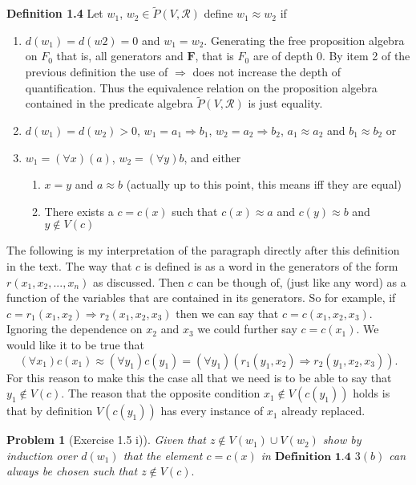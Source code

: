 \documentclass{article}
\theoremstyle{problemstyle}
\newtheorem{problem}{Problem}
\begin{document}
\begin{flushleft}
\textbf{Definition 1.4} Let $w_1$, $w_2 \in \widetilde{P}(V,\mathscr{R})$ define $w_1 \approx w_2$ if

\begin{enumerate}
\item $d(w_1) = d(w2) = 0$ and $w_1 = w_2$. Generating the free proposition algebra on $F_0$ that is, all generators and $\textbf{F}$, that is $F_0$ are of depth 0. By item 2 of the previous definition the use of $\Rightarrow$ does not increase the depth of quantification. Thus the equivalence relation on the proposition algebra contained in the predicate algebra $\widetilde{P}(V,\mathscr{R})$ is just equality. 
\item $d(w_1) = d(w_2) > 0$, $w_1 = a_1 \Rightarrow b_1$, $w_2 = a_2 \Rightarrow b_2$, $a_1 \approx a_2$ and $b_1 \approx b_2$ or 
\item $w_1 = (\forall x)(a)$, $w_2 = (\forall y)b$, and either
\begin{enumerate}
\item $x = y$ and $a \approx b$   (actually up to this point, this means iff they are equal)
\item There exists a $c = c(x)$ such that $c(x) \approx a$ and $c(y) \approx b$ and $y \notin V(c)$ 
\end{enumerate}
\end{enumerate}

The following is my interpretation of the paragraph directly after this definition in the text. The way that $c$ is defined is as a word in the generators of the form $r(x_1,x_2,...,x_n)$ as discussed. Then $c$ can be though of, (just like any word) as a function of the variables that are contained in its generators. So for example, if $c = r_1(x_1,x_2)\Rightarrow r_2(x_1,x_2,x_3)$ then we can say that $c = c(x_1,x_2,x_3)$. Ignoring the dependence on $x_2$ and $x_3$ we could further say $c = c(x_1)$. We would like it to be true that $$(\forall x_1)c(x_1) \approx (\forall y_1)c(y_1) = (\forall y_1)(r_1(y_1,x_2)\Rightarrow r_2(y_1,x_2,x_3)).$$ For this reason to make this the case all that we need is to be able to say that $y_1 \notin V(c)$. The reason that the opposite condition $x_1 \notin V(c(y_1))$ holds is that by definition $V(c(y_1))$ has every instance of $x_1$ already replaced. 
\end{flushleft}

\begin{problem}[Exercise 1.5 i)]
Given that $z \notin V(w_1) \cup V(w_2)$ show by induction over $d(w_1)$ that the element $c = c(x)$ in $\textbf{Definition 1.4}$ $3 (b)$ can always be chosen such that $z \notin V(c).$
\end{problem}
\end{document}
